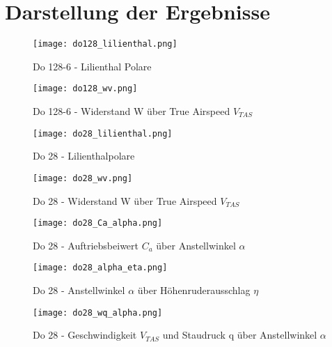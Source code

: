 \chapter{Darstellung der Ergebnisse}
\label{chapter:darstellung}
\vspace{2cm}
\begin{figure}[h]
	\begin{center}
		\texttt{[image: do128\_lilienthal.png]} 
		\caption{Do 128-6 - Lilienthal Polare}
	\end{center}
\end{figure}
\begin{figure}[h]
	\begin{center}
		\texttt{[image: do128\_wv.png]} 
		\caption{Do 128-6 - Widerstand W über True Airspeed $V_{TAS}$}
	\end{center}
\end{figure}
\vspace{-10mm}
\begin{figure}[h]
	\begin{center}
		\texttt{[image: do28\_lilienthal.png]} 
		\caption{Do 28 - Lilienthalpolare}
	\end{center}
\end{figure}
\begin{figure}[h]
\begin{center}
	\texttt{[image: do28\_wv.png]} 
	\caption{Do 28 - Widerstand W über True Airspeed $V_{TAS}$}
\end{center}
\end{figure}
\begin{figure}[h]
\begin{center}
	\texttt{[image: do28\_Ca\_alpha.png]} 
	\caption{Do 28 - Auftriebsbeiwert $C_a$ über Anstellwinkel $\alpha$}
\end{center}
\end{figure}
\begin{figure}[h]
\begin{center}
	\texttt{[image: do28\_alpha\_eta.png]} 
	\caption{Do 28 - Anstellwinkel $\alpha$ über Höhenruderausschlag $\eta$} \label{fig:alphaetaDO28}
\end{center}
\end{figure}
\begin{figure}[h]
\begin{center}
	\texttt{[image: do28\_wq\_alpha.png]} 
	\caption{Do 28 - Geschwindigkeit $V_{TAS}$ und Staudruck q über Anstellwinkel $\alpha$}
\end{center}
\end{figure}
\newpage